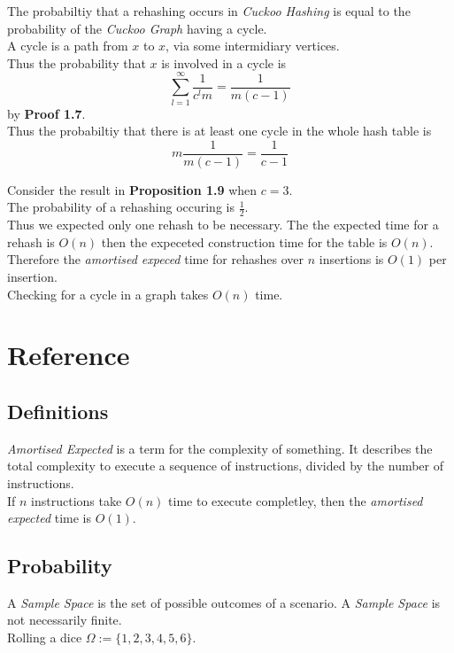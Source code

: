 \documentclass[11pt,a4paper]{article}
\begin{document}
The probabiltiy that a rehashing occurs in \textit{Cuckoo Hashing} is equal to the probability of the \textit{Cuckoo Graph} having a cycle.\\
A cycle is a path from $x$ to $x$, via some intermidiary vertices.\\
Thus the probability that $x$ is involved in a cycle is
$$\sum_{l=1}^\infty\frac1{c^lm}=\frac1{m(c-1)}$$
by \textbf{Proof 1.7}.\\
Thus the probabiltiy that there is at least one cycle in the whole hash table is
$$m\frac1{m(c-1)}=\frac1{c-1}$$

Consider the result in \textbf{Proposition 1.9} when $c=3$.\\
The probability of a rehashing occuring is $\frac12$.\\
Thus we expected only one rehash to be necessary. The the expected time for a rehash is $O(n)$ then the expeceted construction time for the table is $O(n)$.\\
Therefore the \textit{amortised expeced} time for rehashes over $n$ insertions is $O(1)$ per insertion.\\
\nb Checking for a cycle in a graph takes $O(n)$ time.

\newpage
\setcounter{section}{-1}
\section{Reference}

\subsection{Definitions}

\textit{Amortised Expected} is a term for the complexity of something. It describes the total complexity to execute a sequence of instructions, divided by the number of instructions.\\
\eg If $n$ instructions take $O(n)$ time to execute completley, then the \textit{amortised expected} time is $O(1)$.

\subsection{Probability}

A \textit{Sample Space} is the set of possible outcomes of a scenario. A \textit{Sample Space} is not necessarily finite.\\
\eg Rolling a dice $\Omega:=\{1,2,3,4,5,6\}$.\\
\end{document}
